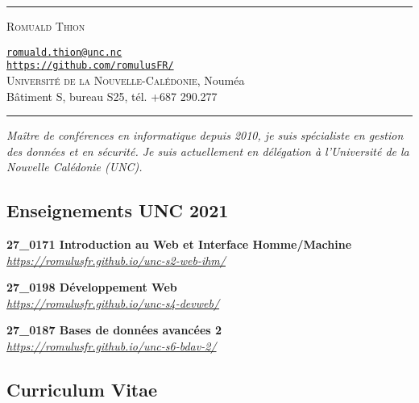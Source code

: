 \documentclass[12pt,a4paper]{article}
\newcommand{\hr}{\textcolor{gris80}{\rule{\linewidth}{0.5pt}}}
\newcommand{\activite}[1]{\textbf{#1}\xspace}
\newcommand{\comment}[1]{\textsl{#1}\xspace}
\newcommand{\UNC}{\textsc{Universit{\'e} de la Nouvelle-Calédonie}\xspace}
\begin{document}
\hr

\vspace{0.5em}

\begin{minipage}[c]{0.5\textwidth}
  \begin{center}
    {\LARGE\textsc{Romuald Thion}} %
  \end{center}
\end{minipage}
\begin{minipage}[c]{0.5\textwidth}
  \begin{center}
    \href{mailto:romuald.thion@unc.nc}{\nolinkurl{romuald.thion@unc.nc}}\\
    \href{https://github.com/romulusFR/}{\nolinkurl{https://github.com/romulusFR/}}\\
    \UNC, Nouméa\\
    Bâtiment S, bureau S25, tél. +687 290.277
  \end{center}
\end{minipage}

\vspace{0.5em}

\hr

\begin{center}
  \emph{Maître de conférences en informatique depuis 2010, je suis spécialiste en gestion des données et en sécurité. Je suis actuellement en délégation à l'Université de la Nouvelle Calédonie (UNC).}
\end{center}

\subsection*{Enseignements UNC 2021} 
     \activite{27\_0171 Introduction au Web et Interface Homme/Machine}\\
     \comment{\url{https://romulusfr.github.io/unc-s2-web-ihm/}} 

     \activite{27\_0198 Développement Web}\\
     \comment{\url{https://romulusfr.github.io/unc-s4-devweb/}} 

     \activite{27\_0187 Bases de données avancées 2}\\
     \comment{\url{https://romulusfr.github.io/unc-s6-bdav-2/}}

\subsection*{Curriculum Vitae} 
\end{document}
